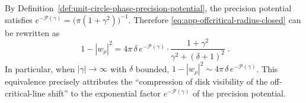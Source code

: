 \begin{remark}\label{rem:app-offcritical-radius-precision-potential}
By Definition~\ref{def:unit-circle-phase-precision-potential}, the precision potential satisfies
\(
e^{-\mathcal{P}(\gamma)}=\bigl(\pi(1+\gamma^{2})\bigr)^{-1}
\).
Therefore \eqref{eq:app-offcritical-radius-closed} can be rewritten as
\begin{equation}\label{eq:app-offcritical-radius-via-precision-potential}
\boxed{\;
1-|w_{\rho}|^{2}
=4\pi\,\delta\,e^{-\mathcal{P}(\gamma)}\cdot\frac{1+\gamma^{2}}{\gamma^{2}+(\delta+1)^{2}}\; }.
\end{equation}
In particular, when \(|\gamma|\to\infty\) with \(\delta\) bounded,
\(
1-|w_{\rho}|^{2}\sim 4\pi\,\delta\,e^{-\mathcal{P}(\gamma)}
\).
This equivalence precisely attributes the ``compression of disk visibility of the off-critical-line shift'' to the exponential factor \(e^{-\mathcal{P}(\gamma)}\) of the precision potential.
\end{remark}



